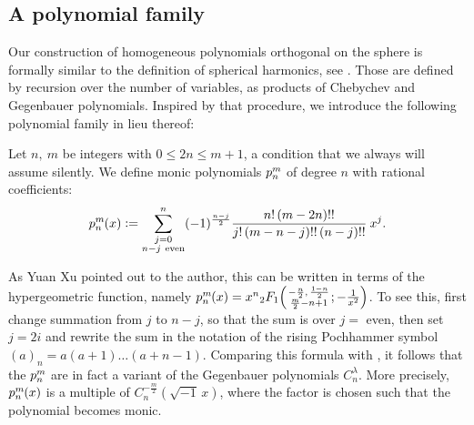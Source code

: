 \subsection{A polynomial family} 
Our construction of homogeneous polynomials orthogonal on the sphere is formally similar to the definition of spherical harmonics, see \cite[p.~35]{Dunkl}. Those are defined by recursion over the number of variables, as products of Chebychev and Gegenbauer polynomials. Inspired by that procedure, we introduce the following polynomial family in lieu thereof:
\begin{definition} Let $n,\ m$ be integers with $0\leq 2n\leq m+1$, a condition that we always will assume silently. We define monic polynomials $p_{n}^{m}\;\!\!$ of degree $n$ with rational coefficients:
\begin{equation*}
p_{n}^{m}\;\!\!(x) \vcentcolon= \sum_{\substack{j=0\\ n-j\ \text{even}}}^n (-1)^{\frac{n-j}{2}} \frac{n!\,(m-2n)!!}{j!\,(m-n-j)!!\,(n-j)!!}\:x^j.
\end{equation*}
\end{definition}
\begin{remark}
As Yuan Xu pointed out to the author, this can be written in terms of the hypergeometric function, namely $\pol{n}{m}(x) = x^n\vphantom{}_2F_1\!\left( \genfrac{}{}{0pt}{}{-\frac{n}{2},\,\frac{1-n}{2}}{\frac{m}{2}-n+1} ; -\frac{1}{x^2}\right)$. To see this, first change summation from $j$ to $n-j$, so that the sum is over $j\! =$ even, then set $j\! =\!2i$ and rewrite the sum in the notation of the rising Pochhammer symbol $(a)_n = a (a\!+\!1)\ldots(a\!+\!n\!-\!1)$. Comparing this formula with \cite[Prop.~1.4.11]{Dunkl}, it follows that the $p_{n}^{m}\;\!\!$ are in fact a variant of the Gegenbauer polynomials $C_n^\lambda$. More precisely, $p_{n}^{m}\;\!\!(x)$ is a multiple of $C^{-\frac{m}{2}}_n\!\!\left(\sqrt{-1}\,x\right)$, where the factor is chosen such that the polynomial becomes monic.
\end{remark}

